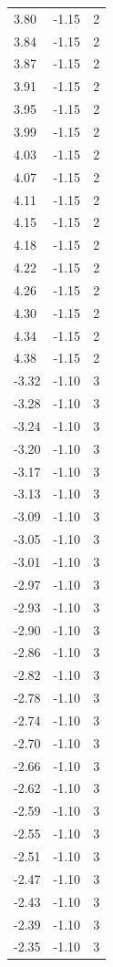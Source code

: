 \begin{longtable}{lrr}
  3.80 & -1.15 & 2 \\
  3.84 & -1.15 & 2 \\
  3.87 & -1.15 & 2 \\
  3.91 & -1.15 & 2 \\
  3.95 & -1.15 & 2 \\
  3.99 & -1.15 & 2 \\
  4.03 & -1.15 & 2 \\
  4.07 & -1.15 & 2 \\
  4.11 & -1.15 & 2 \\
  4.15 & -1.15 & 2 \\
  4.18 & -1.15 & 2 \\
  4.22 & -1.15 & 2 \\
  4.26 & -1.15 & 2 \\
  4.30 & -1.15 & 2 \\
  4.34 & -1.15 & 2 \\
  4.38 & -1.15 & 2 \\
  -3.32 & -1.10 & 3 \\
  -3.28 & -1.10 & 3 \\
  -3.24 & -1.10 & 3 \\
  -3.20 & -1.10 & 3 \\
  -3.17 & -1.10 & 3 \\
  -3.13 & -1.10 & 3 \\
  -3.09 & -1.10 & 3 \\
  -3.05 & -1.10 & 3 \\
  -3.01 & -1.10 & 3 \\
  -2.97 & -1.10 & 3 \\
  -2.93 & -1.10 & 3 \\
  -2.90 & -1.10 & 3 \\
  -2.86 & -1.10 & 3 \\
  -2.82 & -1.10 & 3 \\
  -2.78 & -1.10 & 3 \\
  -2.74 & -1.10 & 3 \\
  -2.70 & -1.10 & 3 \\
  -2.66 & -1.10 & 3 \\
  -2.62 & -1.10 & 3 \\
  -2.59 & -1.10 & 3 \\
  -2.55 & -1.10 & 3 \\
  -2.51 & -1.10 & 3 \\
  -2.47 & -1.10 & 3 \\
  -2.43 & -1.10 & 3 \\
  -2.39 & -1.10 & 3 \\
  -2.35 & -1.10 & 3 \\

\end{longtable}

